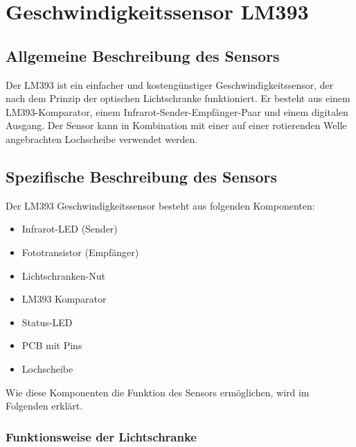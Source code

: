 %
%

\chapter{Geschwindigkeitssensor LM393}


\section{Allgemeine Beschreibung des Sensors}

Der LM393 ist ein einfacher und kostengünstiger Geschwindigkeitssensor, der nach dem Prinzip der optischen Lichtschranke funktioniert. Er besteht aus einem LM393-Komparator, einem Infrarot-Sender-Empfänger-Paar und einem digitalen Ausgang. Der Sensor kann in Kombination mit einer auf einer rotierenden Welle angebrachten Lochscheibe verwendet werden. \cite{LM393.1} \cite{Parthier}

\section{Spezifische Beschreibung des Sensors}

Der LM393 Geschwindigkeitssensor besteht aus folgenden Komponenten:

\begin{itemize}
	\item Infrarot-LED (Sender)
	\item Fototransistor (Empfänger)
	\item Lichtschranken-Nut
	\item LM393 Komparator
	\item Status-LED
	\item PCB mit Pins
	\item Lochscheibe
\end{itemize}

Wie diese Komponenten die Funktion des Sensors ermöglichen, wird im Folgenden erklärt.

\subsection{Funktionsweise der Lichtschranke}

